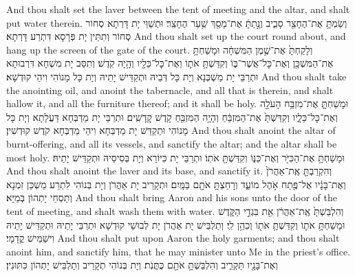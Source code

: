 {And thou shalt set the laver between the tent of meeting and the altar, and shalt put water therein.}{}
{וְשַׂמְתָּ֥ אֶת־הֶחָצֵ֖ר סָבִ֑יב וְנָ֣תַתָּ֔ אֶת־מָסַ֖ךְ שַׁ֥עַר הֶחָצֵֽר׃}
{וּתְשַׁוֵּי יָת דָּרְתָא סְחוֹר סְחוֹר וְתִתֵּין יָת פְּרָסָא דִּתְרַע דָּרְתָא׃}
{And thou shalt set up the court round about, and hang up the screen of the gate of the court.}{}
{וְלָקַחְתָּ֙ אֶת־שֶׁ֣מֶן הַמִּשְׁחָ֔ה וּמָשַׁחְתָּ֥ אֶת־הַמִּשְׁכָּ֖ן וְאֶת־כׇּל־אֲשֶׁר־בּ֑וֹ וְקִדַּשְׁתָּ֥ אֹת֛וֹ וְאֶת־כׇּל־כֵּלָ֖יו וְהָ֥יָה קֹֽדֶשׁ׃}
{וְתִסַּב יָת מִשְׁחָא דִּרְבוּתָא וּתְרַבֵּי יָת מַשְׁכְּנָא וְיָת כָּל דְּבֵיהּ וּתְקַדֵּישׁ יָתֵיהּ וְיָת כָּל מָנוֹהִי וִיהֵי קוּדְשָׁא׃}
{And thou shalt take the anointing oil, and anoint the tabernacle, and all that is therein, and shalt hallow it, and all the furniture thereof; and it shall be holy.}{}
{וּמָשַׁחְתָּ֛ אֶת־מִזְבַּ֥ח הָעֹלָ֖ה וְאֶת־כׇּל־כֵּלָ֑יו וְקִדַּשְׁתָּ֙ אֶת־הַמִּזְבֵּ֔חַ וְהָיָ֥ה הַמִּזְבֵּ֖חַ קֹ֥דֶשׁ קׇֽדָשִֽׁים׃}
{וּתְרַבֵּי יָת מַדְבְּחָא דַּעֲלָתָא וְיָת כָּל מָנוֹהִי וּתְקַדֵּשׁ יָת מַדְבְּחָא וִיהֵי מַדְבְּחָא קֹדֶשׁ קוּדְשִׁין׃}
{And thou shalt anoint the altar of burnt-offering, and all its vessels, and sanctify the altar; and the altar shall be most holy.}{}
{וּמָשַׁחְתָּ֥ אֶת־הַכִּיֹּ֖ר וְאֶת־כַּנּ֑וֹ וְקִדַּשְׁתָּ֖ אֹתֽוֹ׃}
{וּתְרַבֵּי יָת כִּיּוֹרָא וְיָת בְּסִיסֵיהּ וּתְקַדֵּישׁ יָתֵיהּ׃}
{And thou shalt anoint the laver and its base, and sanctify it.}{}
{וְהִקְרַבְתָּ֤ אֶֽת־אַהֲרֹן֙ וְאֶת־בָּנָ֔יו אֶל־פֶּ֖תַח אֹ֣הֶל מוֹעֵ֑ד וְרָחַצְתָּ֥ אֹתָ֖ם בַּמָּֽיִם׃}
{וּתְקָרֵיב יָת אַהֲרֹן וְיָת בְּנוֹהִי לִתְרַע מַשְׁכַּן זִמְנָא וְתַסְחֵי יָתְהוֹן בְּמַיָּא׃}
{And thou shalt bring Aaron and his sons unto the door of the tent of meeting, and shalt wash them with water.}{}
{וְהִלְבַּשְׁתָּ֙ אֶֽת־אַהֲרֹ֔ן אֵ֖ת בִּגְדֵ֣י הַקֹּ֑דֶשׁ וּמָשַׁחְתָּ֥ אֹת֛וֹ וְקִדַּשְׁתָּ֥ אֹת֖וֹ וְכִהֵ֥ן לִֽי׃}
{וְתַלְבֵּישׁ יָת אַהֲרֹן יָת לְבוּשֵׁי קוּדְשָׁא וּתְרַבֵּי יָתֵיהּ וּתְקַדֵּישׁ יָתֵיהּ וִישַׁמֵּישׁ קֳדָמָי׃}
{And thou shalt put upon Aaron the holy garments; and thou shalt anoint him, and sanctify him, that he may minister unto Me in the priest’s office.}{}
{וְאֶת־בָּנָ֖יו תַּקְרִ֑יב וְהִלְבַּשְׁתָּ֥ אֹתָ֖ם כֻּתֳּנֹֽת׃}
{וְיָת בְּנוֹהִי תְקָרֵיב וְתַלְבֵּישׁ יָתְהוֹן כִּתּוּנִין׃}
